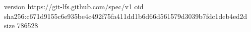 version https://git-lfs.github.com/spec/v1
oid sha256:c671d9155c6e935be4c492f75fa411dd1b6d66d561579d3039b7fdc1deb4ed2d
size 786528
